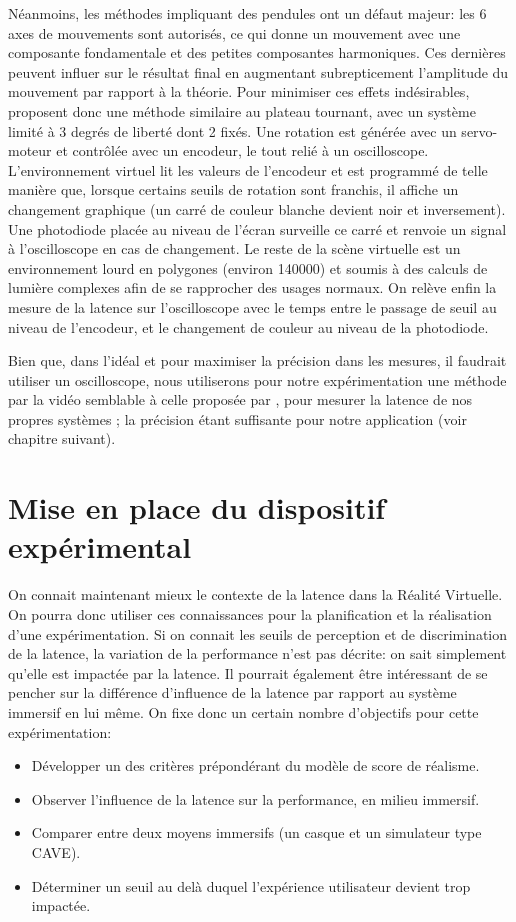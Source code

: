 	\par Néanmoins, les méthodes impliquant des pendules ont un défaut majeur: les 6 axes de mouvements sont autorisés, ce qui donne un mouvement avec une composante fondamentale et des petites composantes harmoniques. Ces dernières peuvent influer sur le résultat final en augmentant subrepticement l'amplitude du mouvement par rapport à la théorie. Pour minimiser ces effets indésirables, \citep{papadakis_system_2011} proposent donc une méthode similaire au plateau tournant, avec un système limité à 3 degrés de liberté dont 2 fixés. Une rotation est générée avec un servo-moteur et contrôlée avec un encodeur, le tout relié à un oscilloscope. L'environnement virtuel lit les valeurs de l'encodeur et est programmé de telle manière que, lorsque certains seuils de rotation sont franchis, il affiche un changement graphique (un carré de couleur blanche devient noir et inversement). Une photodiode placée au niveau de l'écran surveille ce carré et renvoie un signal à l'oscilloscope en cas de changement. Le reste de la scène virtuelle est un environnement lourd en polygones (environ 140000) et soumis à des calculs de lumière complexes afin de se rapprocher des usages normaux. On relève enfin la mesure de la latence sur l'oscilloscope avec le temps entre le passage de seuil au niveau de l'encodeur, et le changement de couleur au niveau de la photodiode.
	
	\par Bien que, dans l'idéal et pour maximiser la précision dans les mesures, il faudrait utiliser un oscilloscope, nous utiliserons pour notre expérimentation une méthode par la vidéo semblable à celle proposée par \citep{steed_simple_2008}, pour mesurer la latence de nos propres systèmes ; la précision étant suffisante pour notre application (voir chapitre suivant).
	
	
\chapter{Mise en place du dispositif expérimental}
	\par On connait maintenant mieux le contexte de la latence dans la Réalité Virtuelle. On pourra donc utiliser ces connaissances pour la planification et la réalisation d'une expérimentation. Si on connait les seuils de perception et de discrimination de la latence, la variation de la performance n'est pas décrite: on sait simplement qu'elle est impactée par la latence. Il pourrait également être intéressant de se pencher sur la différence d'influence de la latence par rapport au système immersif en lui même. On fixe donc un certain nombre d'objectifs pour cette expérimentation:
	\begin{itemize}
		\item Développer un des critères prépondérant du modèle de score de réalisme.
		\item Observer l'influence de la latence sur la performance, en milieu immersif.
		\item Comparer entre deux moyens immersifs (un casque et un simulateur type CAVE).
		\item Déterminer un seuil au delà duquel l'expérience utilisateur devient trop impactée. 
	\end{itemize}
	
